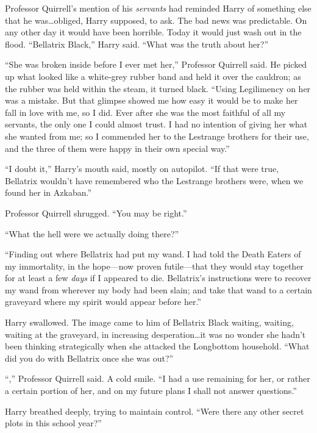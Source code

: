 Professor Quirrell’s mention of his \emph{servants} had reminded Harry of something else that he was…obliged, Harry supposed, to ask. The bad news was predictable. On any other day it would have been horrible. Today it would just wash out in the flood. “Bellatrix Black,” Harry said. “What was the truth about her?”

“She was broken inside before I ever met her,” Professor Quirrell said. He picked up what looked like a white-grey rubber band and held it over the cauldron; as the rubber was held within the steam, it turned black. “Using Legilimency on her was a mistake. But that glimpse showed me how easy it would be to make her fall in love with me, so I did. Ever after she was the most faithful of all my servants, the only one I could almost trust. I had no intention of giving her what she wanted from me; so I commended her to the Lestrange brothers for their use, and the three of them were happy in their own special way.”

“I doubt it,” Harry’s mouth said, mostly on autopilot. “If that were true, Bellatrix wouldn’t have remembered who the Lestrange brothers were, when we found her in Azkaban.”

Professor Quirrell shrugged. “You may be right.”

“What the hell were we actually doing there?”

“Finding out where Bellatrix had put my wand. I had told the Death Eaters of my immortality, in the hope—now proven futile—that they would stay together for at least a few \emph{days} if I appeared to die. Bellatrix’s instructions were to recover my wand from wherever my body had been slain; and take that wand to a certain graveyard where my spirit would appear before her.”

Harry swallowed. The image came to him of Bellatrix Black waiting, waiting, waiting at the graveyard, in increasing desperation…it was no wonder she hadn’t been thinking strategically when she attacked the Longbottom household. “What did you do with Bellatrix once she was out?”

“,” Professor Quirrell said. A cold smile. “I had a use remaining for her, or rather a certain portion of her, and on my future plans I shall not answer questions.”

Harry breathed deeply, trying to maintain control. “Were there any other secret plots in this school year?”

